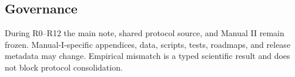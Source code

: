 \subsection{Governance}

During R0--R12 the main note, shared protocol source, and Manual II remain
frozen.  Manual-I-specific appendices, data, scripts, tests, roadmaps, and
release metadata may change.  Empirical mismatch is a typed scientific result
and does not block protocol consolidation.
